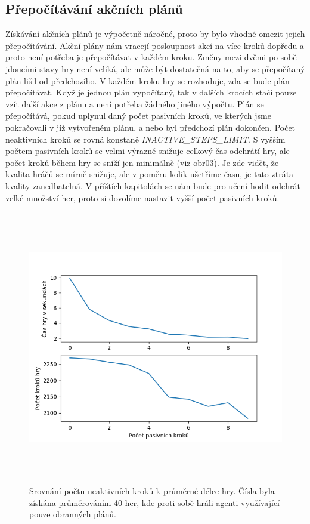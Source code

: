 \subsection{Přepočítávání akčních plánů}
Získávání akčních plánů je výpočetně náročné, proto by bylo vhodné omezit jejich přepočítávání. Akční plány nám vracejí posloupnost akcí na více kroků dopředu a proto není potřeba je přepočítávat v každém kroku.
Změny mezi dvěmi po sobě jdoucími stavy hry není veliká, ale může být dostatečná na to, aby se přepočítaný plán lišil od předchozího.
V každém kroku hry se rozhoduje, zda se bude plán přepočítávat. Když je jednou plán vypočítaný, tak v dalších krocích stačí pouze vzít další akce z plánu a není potřeba žádného jiného výpočtu.
Plán se přepočítává, pokud uplynul daný počet pasivních kroků, ve kterých jsme pokračovali v již vytvořeném plánu, a nebo byl předchozí plán dokončen.
Počet neaktivních kroků se rovná konstaně \emph{\uppercase{inactive\_steps\_limit}}. 
S vyšším počtem pasivních kroků se velmi výrazně snižuje celkový čas odehrátí hry, ale počet kroků během hry se sníží jen minimálně (viz obr03).
Je zde vidět, že kvalita hráčů se mírně snižuje, ale v poměru kolik ušetříme času, je tato ztráta kvality zanedbatelná.
V příštích kapitolách se nám bude pro učení hodit odehrát velké množství her, proto si dovolíme nastavit vyšší počet pasivních kroků.


\begin{figure}[hp]

\includegraphics[width=150mm, height=120mm]{./Obrazky/Inactive_steps_comparison2.png}
\caption{Srovnání počtu neaktivních kroků k průměrné délce hry. Čísla byla získána průměrováním 40 her, kde proti sobě hráli agenti využívající pouze obranných plánů.}
\label{obr03:}
\end{figure}

